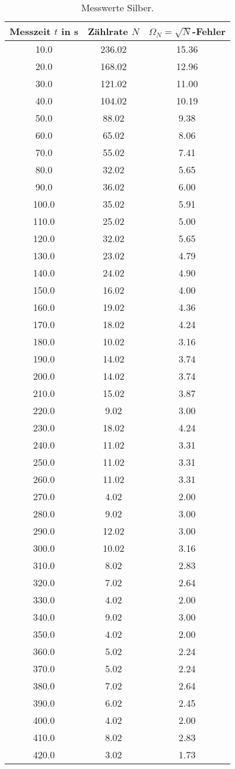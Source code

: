 \begin{table}
  \centering
  \caption{Messwerte Silber.}
  \label{tab:N2}
\begin{tabular}{c c c}
  \toprule
  Messzeit $t$ in s & Zählrate $N$ & $\Omega_N = \sqrt{N}$-Fehler\\
  \midrule
  10.0 & 236.02 & 15.36 \\
  20.0 & 168.02 & 12.96 \\
  30.0 & 121.02 & 11.00 \\
  40.0 & 104.02 & 10.19 \\
  50.0 & 88.02 & 9.38  \\
  60.0 & 65.02 & 8.06  \\
  70.0 & 55.02 & 7.41  \\
  80.0 & 32.02 & 5.65  \\
  90.0 & 36.02 & 6.00  \\
  100.0 & 35.02 & 5.91  \\
  110.0 & 25.02 & 5.00  \\
  120.0 & 32.02 & 5.65  \\
  130.0 & 23.02 & 4.79  \\
  140.0 & 24.02 & 4.90  \\
  150.0 & 16.02 & 4.00 \\
  160.0 & 19.02 & 4.36  \\
  170.0 & 18.02 & 4.24  \\
  180.0 & 10.02 & 3.16  \\
  190.0 & 14.02 & 3.74  \\
  200.0 & 14.02 & 3.74  \\
  210.0 & 15.02 & 3.87  \\
  220.0 & 9.02 & 3.00  \\
  230.0 & 18.02 & 4.24  \\
  240.0 & 11.02 & 3.31  \\
  250.0 & 11.02 & 3.31  \\
  260.0 & 11.02 & 3.31  \\
  270.0 & 4.02 & 2.00  \\
  280.0 & 9.02 & 3.00  \\
  290.0 & 12.02 & 3.00  \\
  300.0 & 10.02 & 3.16  \\
  310.0 & 8.02 & 2.83  \\
  320.0 & 7.02 & 2.64  \\
  330.0 & 4.02 & 2.00  \\
  340.0 & 9.02 & 3.00  \\
  350.0 & 4.02 & 2.00  \\
  360.0 & 5.02 & 2.24  \\
  370.0 & 5.02 & 2.24  \\
  380.0 & 7.02 & 2.64  \\
  390.0 & 6.02 & 2.45  \\
  400.0 & 4.02 & 2.00  \\
  410.0 & 8.02 & 2.83  \\
  420.0 & 3.02 & 1.73  \\
  \bottomrule
\end{tabular}
\end{table}
\FloatBarrier

